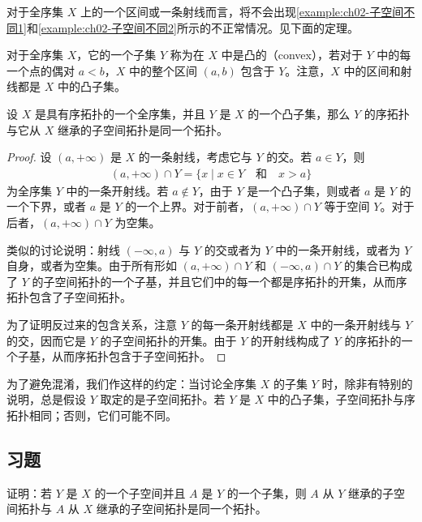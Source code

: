 \documentclass[../../main.tex]{subfiles}
\begin{document}
对于全序集 $X$ 上的一个区间或一条射线而言，将不会出现\cref{example:ch02-子空间不同1}和\cref{example:ch02-子空间不同2}所示的不正常情况。见下面的定理。

对于全序集 $X$，它的一个子集 $Y$ 称为在 $X$ 中是凸的（convex），若对于 $Y$ 中的每一个点的偶对 $a < b$，$X$ 中的整个区间 $(a, b)$ 包含于 $Y$。注意，$X$ 中的区间和射线都是 $X$ 中的凸子集。

\begin{theorem}[凸子集上序拓扑与子空间拓扑一致]\label{theorem:ch02-凸序一致}
设 $X$ 是具有序拓扑的一个全序集，并且 $Y$ 是 $X$ 的一个凸子集，那么 $Y$ 的序拓扑与它从 $X$ 继承的子空间拓扑是同一个拓扑。
\end{theorem}

\begin{proof}
设 $(a, +\infty)$ 是 $X$ 的一条射线，考虑它与 $Y$ 的交。若 $a \in Y$，则
\begin{align*}
(a, +\infty) \cap Y = \{x \mid x \in Y \quad \text{和} \quad x > a\}
\end{align*}
为全序集 $Y$ 中的一条开射线。若 $a \notin Y$，由于 $Y$ 是一个凸子集，则或者 $a$ 是 $Y$ 的一个下界，或者 $a$ 是 $Y$ 的一个上界。对于前者，$(a, +\infty) \cap Y$ 等于空间 $Y$。对于后者，$(a, +\infty) \cap Y$ 为空集。

类似的讨论说明：射线 $(-\infty, a)$ 与 $Y$ 的交或者为 $Y$ 中的一条开射线，或者为 $Y$ 自身，或者为空集。由于所有形如 $(a, +\infty) \cap Y$ 和 $(-\infty, a) \cap Y$ 的集合已构成了 $Y$ 的子空间拓扑的一个子基，并且它们中的每一个都是序拓扑的开集，从而序拓扑包含了子空间拓扑。

为了证明反过来的包含关系，注意 $Y$ 的每一条开射线都是 $X$ 中的一条开射线与 $Y$ 的交，因而它是 $Y$ 的子空间拓扑的开集。由于 $Y$ 的开射线构成了 $Y$ 的序拓扑的一个子基，从而序拓扑包含于子空间拓扑。
\end{proof}

为了避免混淆，我们作这样的约定：当讨论全序集 $X$ 的子集 $Y$ 时，除非有特别的说明，总是假设 $Y$ 取定的是子空间拓扑。若 $Y$ 是 $X$ 中的凸子集，子空间拓扑与序拓扑相同；否则，它们可能不同。

\subsection*{习题}

\begin{exercise}\label{exercise:ch02-子空间拓扑-1}
证明：若 $Y$ 是 $X$ 的一个子空间并且 $A$ 是 $Y$ 的一个子集，则 $A$ 从 $Y$ 继承的子空间拓扑与 $A$ 从 $X$ 继承的子空间拓扑是同一个拓扑。
\end{exercise}
\end{document}
